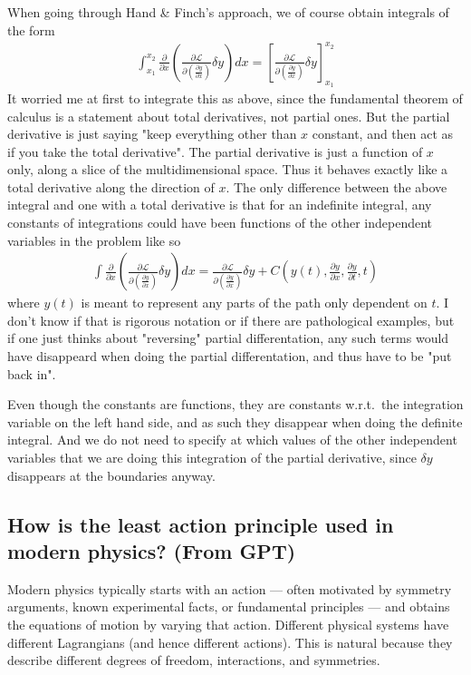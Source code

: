 \documentclass[a4paper]{article}
\begin{document}
    When going through Hand \& Finch's approach, we of course obtain integrals of the form \begin{align*}
        \int_{x_1}^{x_2} \frac{\partial}{\partial x} \left( \frac{\partial \mathcal{L} }{\partial \left( \frac{\partial y}{\partial x}  \right) } \delta y \right)  dx = \left[ \frac{\partial \mathcal{L} }{\partial \left( \frac{\partial y}{\partial x}  \right) } \delta y \right]_{x_1}^{x_2}
    \end{align*}
    It worried me at first to integrate this as above, since the fundamental theorem of calculus is a statement about total derivatives, not partial ones. But the partial derivative is just saying "keep everything other than \(x\) constant, and then act as if you take the total derivative". The partial derivative is just a function of \(x\) only, along a slice of the multidimensional space. Thus it behaves exactly like a total derivative along the direction of \(x\). The only difference between the above integral and one with a total derivative is that for an indefinite integral, any constants of integrations could have been functions of the other independent variables in the problem like so \begin{align*}
        \int \frac{\partial}{\partial x} \left( \frac{\partial \mathcal{L} }{\partial \left( \frac{\partial y}{\partial x}  \right) } \delta y \right)  dx = \frac{\partial \mathcal{L} }{\partial \left( \frac{\partial y}{\partial x}  \right) } \delta y + C\left(y(t), \frac{\partial y}{\partial x}, \frac{\partial y}{\partial t}, t\right)
    \end{align*}
    where \(y(t)\) is meant to represent any parts of the path only dependent on \(t\). I don't know if that is rigorous notation or if there are pathological examples, but if one just thinks about "reversing" partial differentation, any such terms would have disappeard when doing the partial differentation, and thus have to be "put back in". 

    Even though the constants are functions, they are constants w.r.t.\ the integration variable on the left hand side, and as such they disappear when doing the definite integral. And we do not need to specify at which values of the other independent variables that we are doing this integration of the partial derivative, since \(\delta y\) disappears at the boundaries anyway.

    \subsection{How is the least action principle used in modern physics? (From GPT)}
    Modern physics typically starts with an action — often motivated by symmetry arguments, known experimental facts, or fundamental principles — and obtains the equations of motion by varying that action. Different physical systems have different Lagrangians (and hence different actions). This is natural because they describe different degrees of freedom, interactions, and symmetries.
\end{document}
